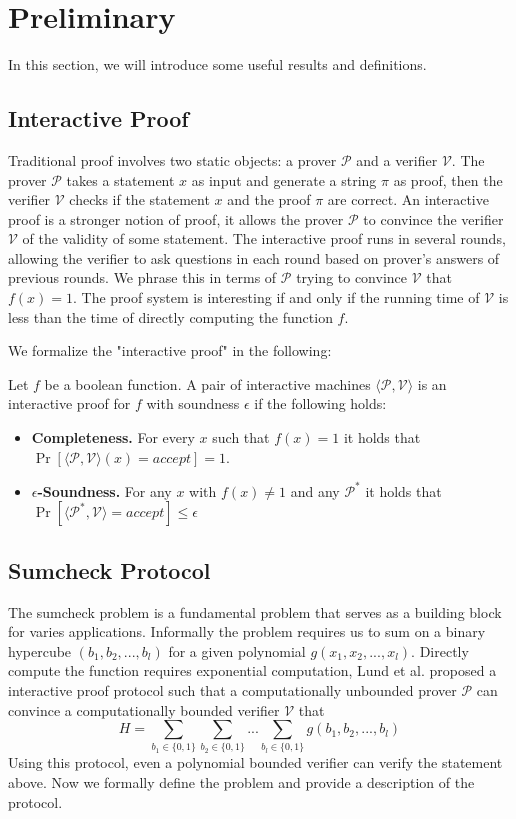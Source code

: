 \section{Preliminary}
\label{sec::prelim}
In this section, we will introduce some useful results and definitions.
\subsection{Interactive Proof}
Traditional proof involves two static objects: a prover $\mathcal{P}$ and a verifier $\mathcal{V}$. The prover $\mathcal{P}$ takes a statement $x$ as input and generate a string $\pi$ as proof, then the verifier $\mathcal{V}$ checks if the statement $x$ and the proof $\pi$ are correct. An interactive proof is a stronger notion of proof, it allows the prover $\mathcal{P}$ to convince the verifier $\mathcal{V}$ of the validity of some statement. The interactive proof runs in several rounds, allowing the verifier to ask questions in each round based on prover's answers of previous rounds. We phrase this in terms of $\mathcal{P}$ trying to convince $\mathcal{V}$ that $f(x)=1$. The proof system is interesting if and only if the running time of $\mathcal{V}$ is less than the time of directly computing the function $f$.

We formalize the "interactive proof" in the following:	
\begin{definition}
	Let $f$ be a boolean function. A pair of interactive machines $\langle\mathcal{P}, \mathcal{V}\rangle$ is an interactive proof for $f$ with soundness $\epsilon$ if the following holds:
	\begin{itemize}
		\item {\bf Completeness.} For every $x$ such that $f(x) = 1$ it holds that $\Pr[\langle\mathcal{P}, \mathcal{V}\rangle(x)=accept]=1$.
		\item {\bf $\epsilon$-Soundness.} For any $x$ with $f(x) \neq 1$ and any $\mathcal{P}^*$ it holds that $\Pr[\langle\mathcal{P^*},\mathcal{V}\rangle=accept] \le \epsilon$
	\end{itemize}
\end{definition}

\subsection{Sumcheck Protocol}
\label{subsec::sumcheck}
The sumcheck problem is a fundamental problem that serves as a building block for varies applications. Informally the problem requires us to sum on a binary hypercube $(b_1, b_2, ..., b_{l})$ for a given polynomial $g(x_1, x_2, ..., x_{l})$. Directly compute the function requires exponential computation, Lund et al.\cite{sumcheck} proposed a interactive proof protocol such that a computationally unbounded prover $\mathcal{P}$ can convince a computationally bounded verifier $\mathcal{V}$ that $$H=\sum_{b_1\in\{0,1\}}\sum_{b_2\in\{0,1\}}...\sum_{b_{l}\in\{0,1\}}g(b_1,b_2,...,b_{l})$$
Using this protocol, even a polynomial bounded verifier can verify the statement above. Now we formally define the problem and provide a description of the protocol.

